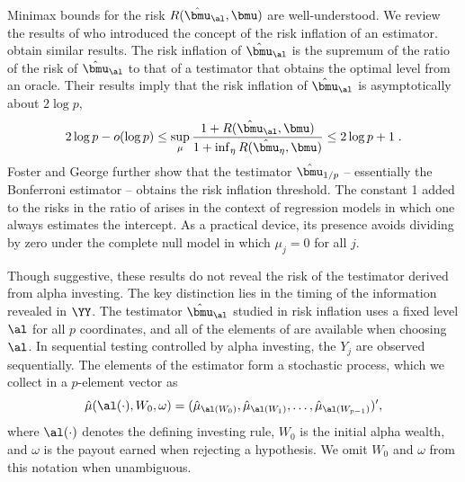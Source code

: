 \documentclass{gSCS2e}
\begin{document}
 Minimax bounds for the risk $R(\hat{\bmu}_\al,\bmu)$ are well-understood.  We
 review the results of \citet{fostergeorge94} who introduced the concept of the
 risk inflation of an estimator. \citet{donohojohnstone94} obtain similar results. 
 The risk inflation of $\hat{\bmu}_\al$ is the supremum of
 the ratio of the risk of $\hat{\bmu}_\al$ to that of a testimator that obtains
 the optimal level from an oracle.  Their results imply that the risk inflation
 of $\hat{\bmu}_\al$ is asymptotically about $2 \log p$,
 \begin{equation}
    2 \log p - o(\log p) 
    \le
    \sup_\mu  \frac{1 + R(\hat{\bmu}_\al,\bmu)}
                   {1 + \inf_\eta{R(\hat{\bmu}_\eta,\bmu)}}  
    \le 
    2 \log p + 1 \;.
 \label{eq:ri}
 \end{equation}
 Foster and George further show that the testimator $\hat{\bmu}_{1/p}$ --
 essentially the Bonferroni estimator -- obtains the risk inflation threshold.
  The constant 1 added to the risks in the ratio of  arises in the
 context of regression models in which one always estimates the intercept.  As a
 practical device, its presence avoids dividing by zero under the complete null
 model in which $\mu_j = 0$ for all $j$.


 Though suggestive, these results do not reveal the risk of the testimator
 derived from alpha investing.  The key distinction lies in the timing of the
 information revealed in $\YY$.  The testimator $\hat{\bmu}_\al$ studied in risk
 inflation uses a fixed level $\al$ for all $p$ coordinates, and all of the
 elements of \YY are available when choosing $\al$.  In sequential testing
 controlled by alpha investing, the $Y_j$ are observed sequentially.  The
 elements of the estimator form a stochastic process, which we collect in a
 $p$-element vector as
 \begin{equation}
   \hat\mu(\al(\cdot),W_0,\omega) = (\hat\mu_{\al(W_0)}, \hat\mu_{\al(W_1)}, \ldots, 
                       \hat\mu_{\al(W_{p-1})})',
 \label{eq:muHatAlphaInv}
 \end{equation}
 where $\al(\cdot)$ denotes the defining investing rule, $W_0$ is the initial
 alpha wealth, and $\omega$ is the payout earned when rejecting a hypothesis.
  We omit $W_0$ and $\omega$ from this notation when unambiguous.
 
\end{document}
